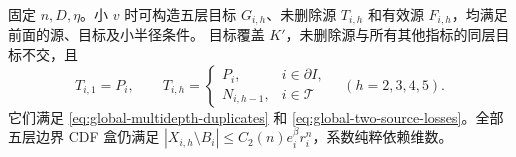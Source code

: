 \begin{lemma}[五深度的未删除源与重复覆盖]\label{lem:global-exterior-union}
固定 \(n,D,\eta\)。小 \(v\) 时可构造五层目标 \(G_{i,h}\)、未删除源
\(T_{i,h}\) 和有效源 \(F_{i,h}\)，均满足前面的源、目标及小半径条件。
目标覆盖 \(K'\)，未删除源与所有其他指标的同层目标不交，且
\begin{equation}\label{eq:global-exterior-union}
 T_{i,1}=P_i,\qquad
 T_{i,h}=
 \begin{cases}
 P_i,&i\in\partial I,\\
 N_{i,h-1},&i\in\mathcal T
 \end{cases}
 \quad(h=2,3,4,5).
\end{equation}
它们满足 \eqref{eq:global-multidepth-duplicates} 和
\eqref{eq:global-two-source-losses}。全部五层边界 CDF 盒仍满足
\(|X_{i,h}\setminus B_i|\le C_2(n)e_i^\beta r_i^n\)，系数纯粹依赖维数。
\end{lemma}
